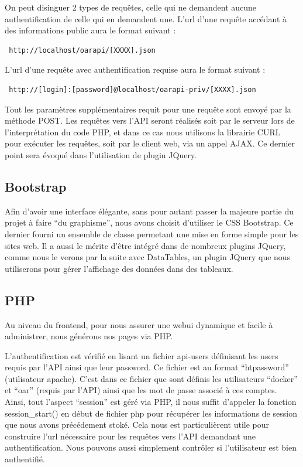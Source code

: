 \documentclass[a4paper,10pt]{article}
\begin{document}
On peut disinguer 2 types de requêtes, celle qui ne demandent aucune authentification de celle qui en demandent une.
L'url d'une requête accédant à des informations public aura le format suivant :

\begin{verbatim}
 http://localhost/oarapi/[XXXX].json
\end{verbatim}

L'url d'une requête avec authentification requise aura le format suivant :

\begin{verbatim}
 http://[login]:[password]@localhost/oarapi-priv/[XXXX].json
\end{verbatim}

Tout les paramètres supplémentaires requit pour une requête sont envoyé par la méthode POST.
Les requêtes vers l'API seront réalisés soit par le serveur lors de l'interprétation du code PHP, et dans ce cas nous utilisons la librairie CURL pour exécuter les requêtes, soit par le client web, via un appel AJAX.
Ce dernier point sera évoqué dans l'utilisation de plugin JQuery.

\subsection{Bootstrap}
Afin d'avoir une interface élégante, sans pour autant passer la majeure partie du projet à faire ``du graphisme'', nous avons choisit d'utiliser le CSS Bootstrap. Ce dernier fourni un ensemble de classe permetant
une mise en forme simple pour les sites web. Il a aussi le mérite d'être intégré dans de nombreux plugins  JQuery, comme nous le verons par la suite avec DataTables, un plugin JQuery que nous utiliserons
pour gérer l'affichage des données dans des tableaux.

\subsection{PHP}
Au niveau du frontend, pour nous assurer une webui dynamique et facile à administrer, nous générons nos pages via PHP.

L'authentification est vérifié en lisant un fichier api-users définisant les users requis par l'API ainsi que leur password. Ce fichier est au format ``htpassword'' (utilisateur apache).
C'est dans ce fichier que sont définis les utilisateurs ``docker'' et ``oar'' (requis par l'API) ainsi que les mot de passe associé à ces comptes.
Ainsi, tout l'aspect ``session'' est géré via PHP, il nous suffit d'appeler la fonction session\_start() en début de fichier php pour récupérer les informations de session que nous avons précédement stoké.
Cela nous est particulièrent utile pour construire l'url nécessaire pour les requêtes vers l'API demandant une authentification. Nous pouvons aussi simplement contrôler si l'utilisateur est bien authentifié.
\vspace{0.5cm}
\end{document}
